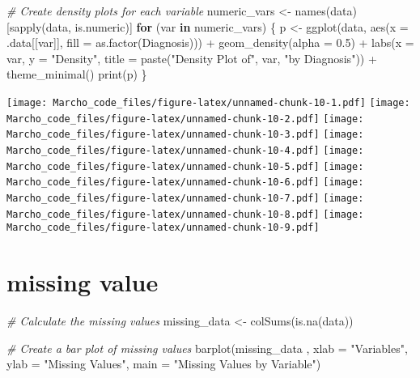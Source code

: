 \documentclass[
]{article}
\newenvironment{Shaded}{\begin{snugshade}}{\end{snugshade}}
\newcommand{\AttributeTok}[1]{\textcolor[rgb]{0.77,0.63,0.00}{#1}}
\newcommand{\CommentTok}[1]{\textcolor[rgb]{0.56,0.35,0.01}{\textit{#1}}}
\newcommand{\ControlFlowTok}[1]{\textcolor[rgb]{0.13,0.29,0.53}{\textbf{#1}}}
\newcommand{\FloatTok}[1]{\textcolor[rgb]{0.00,0.00,0.81}{#1}}
\newcommand{\FunctionTok}[1]{\textcolor[rgb]{0.00,0.00,0.00}{#1}}
\newcommand{\NormalTok}[1]{#1}
\newcommand{\OtherTok}[1]{\textcolor[rgb]{0.56,0.35,0.01}{#1}}
\newcommand{\SpecialCharTok}[1]{\textcolor[rgb]{0.00,0.00,0.00}{#1}}
\newcommand{\StringTok}[1]{\textcolor[rgb]{0.31,0.60,0.02}{#1}}
\begin{document}
\begin{Shaded}
\begin{Highlighting}[]
\CommentTok{\# Create density plots for each variable}
\NormalTok{numeric\_vars }\OtherTok{\textless{}{-}} \FunctionTok{names}\NormalTok{(data)[}\FunctionTok{sapply}\NormalTok{(data, is.numeric)]}
\ControlFlowTok{for}\NormalTok{ (var }\ControlFlowTok{in}\NormalTok{ numeric\_vars) \{}
\NormalTok{  p }\OtherTok{\textless{}{-}} \FunctionTok{ggplot}\NormalTok{(data, }\FunctionTok{aes}\NormalTok{(}\AttributeTok{x =}\NormalTok{ .data[[var]], }\AttributeTok{fill =} \FunctionTok{as.factor}\NormalTok{(Diagnosis))) }\SpecialCharTok{+}
    \FunctionTok{geom\_density}\NormalTok{(}\AttributeTok{alpha =} \FloatTok{0.5}\NormalTok{) }\SpecialCharTok{+}
    \FunctionTok{labs}\NormalTok{(}\AttributeTok{x =}\NormalTok{ var, }\AttributeTok{y =} \StringTok{"Density"}\NormalTok{, }\AttributeTok{title =} \FunctionTok{paste}\NormalTok{(}\StringTok{"Density Plot of"}\NormalTok{, var, }\StringTok{"by Diagnosis"}\NormalTok{)) }\SpecialCharTok{+}
    \FunctionTok{theme\_minimal}\NormalTok{()}
  \FunctionTok{print}\NormalTok{(p)}
\NormalTok{\}}
\end{Highlighting}
\end{Shaded}

\texttt{[image: Marcho\_code\_files/figure-latex/unnamed-chunk-10-1.pdf]}
\texttt{[image: Marcho\_code\_files/figure-latex/unnamed-chunk-10-2.pdf]}
\texttt{[image: Marcho\_code\_files/figure-latex/unnamed-chunk-10-3.pdf]}
\texttt{[image: Marcho\_code\_files/figure-latex/unnamed-chunk-10-4.pdf]}
\texttt{[image: Marcho\_code\_files/figure-latex/unnamed-chunk-10-5.pdf]}
\texttt{[image: Marcho\_code\_files/figure-latex/unnamed-chunk-10-6.pdf]}
\texttt{[image: Marcho\_code\_files/figure-latex/unnamed-chunk-10-7.pdf]}
\texttt{[image: Marcho\_code\_files/figure-latex/unnamed-chunk-10-8.pdf]}
\texttt{[image: Marcho\_code\_files/figure-latex/unnamed-chunk-10-9.pdf]}

\hypertarget{missing-value}{%
\section{missing value}\label{missing-value}}

\begin{Shaded}
\begin{Highlighting}[]
\CommentTok{\# Calculate the missing values}
\NormalTok{missing\_data  }\OtherTok{\textless{}{-}} \FunctionTok{colSums}\NormalTok{(}\FunctionTok{is.na}\NormalTok{(data))}

\CommentTok{\# Create a bar plot of missing values}
\FunctionTok{barplot}\NormalTok{(missing\_data , }\AttributeTok{xlab =} \StringTok{"Variables"}\NormalTok{, }\AttributeTok{ylab =} \StringTok{"Missing Values"}\NormalTok{, }\AttributeTok{main =} \StringTok{"Missing Values by Variable"}\NormalTok{)}
\end{Highlighting}
\end{Shaded}
\end{document}
